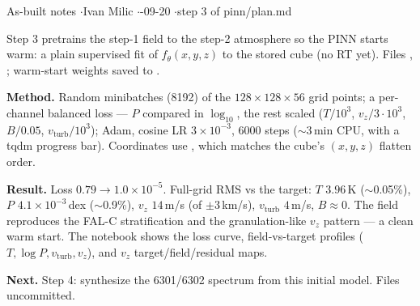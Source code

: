 


%
{As-built notes \quad$\cdot$\quad Ivan Milic \quad$\cdot$-09-20 \quad$\cdot$\quad step 3 of pinn/plan.md}

Step 3 pretrains the step-1 field to the step-2 atmosphere so the PINN starts warm: a plain supervised fit
of $f_\theta(x,y,z)$ to the stored cube (no RT yet). Files ,
; warm-start weights saved to
.

\textbf{Method.} Random minibatches (8192) of the $128\times128\times56$ grid points; a per-channel balanced
loss --- $P$ compared in $\log_{10}$, the rest scaled ($T/10^3$, $v_z/3{\cdot}10^3$, $B/0.05$,
$v_\mathrm{turb}/10^3$);  Adam, cosine LR $3\times10^{-3}$, 6000 steps ($\sim$3\,min CPU, with a
tqdm progress bar). Coordinates use , which matches the cube's $(x,y,z)$ flatten order.

\textbf{Result.} Loss $0.79\to1.0\times10^{-5}$. Full-grid RMS vs the target: $T$ $3.96$\,K ($\sim$0.05\%),
$P$ $4.1\times10^{-3}$\,dex ($\sim$0.9\%), $v_z$ $14$\,m/s (of $\pm3$\,km/s), $v_\mathrm{turb}$ $4$\,m/s,
$B\approx0$. The field reproduces the FAL-C stratification and the granulation-like $v_z$ pattern --- a clean
warm start. The notebook shows the loss curve, field-vs-target profiles ($T,\log P,v_\mathrm{turb},v_z$), and
$v_z$ target/field/residual maps.

\textbf{Next.} Step 4: synthesize the 6301/6302 spectrum from this initial model. Files uncommitted.


